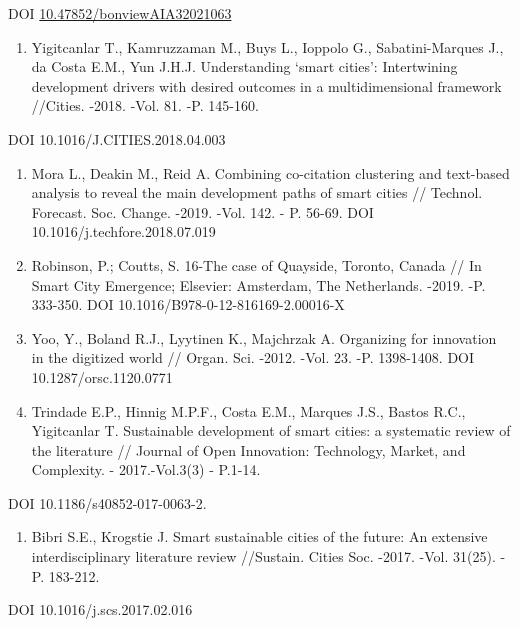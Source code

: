 {DOI
\href{http://dx.doi.org/10.47852/bonviewAIA32021063}{10.47852/bonviewAIA32021063}

\begin{enumerate}
\def\labelenumi{\arabic{enumi}.}
\setcounter{enumi}{16}
\item
  Yigitcanlar T., Kamruzzaman M., Buys L., Ioppolo G., Sabatini-Marques
  J., da Costa E.M., Yun J.H.J. Understanding `smart cities':
  Intertwining development drivers with desired outcomes in a
  multidimensional framework //Cities. -2018. -Vol. 81. -P. 145-160.
\end{enumerate}

DOI 10.1016/J.CITIES.2018.04.003

\begin{enumerate}
\def\labelenumi{\arabic{enumi}.}
\setcounter{enumi}{17}
\item
  Mora L., Deakin M., Reid A. Combining co-citation clustering and
  text-based analysis to reveal the main development paths of smart
  cities // Technol. Forecast. Soc. Change. -2019. -Vol. 142. - P.
  56-69. DOI 10.1016/j.techfore.2018.07.019
\item
  Robinson, P.; Coutts, S. 16-The case of Quayside, Toronto, Canada //
  In Smart City Emergence; Elsevier: Amsterdam, The Netherlands. -2019.
  -P. 333-350. DOI 10.1016/B978-0-12-816169-2.00016-X
\item
  Yoo, Y., Boland R.J., Lyytinen K., Majchrzak A. Organizing for
  innovation in the digitized world // Organ. Sci. -2012. -Vol. 23. -P.
  1398-1408. DOI 10.1287/orsc.1120.0771
\item
  Trindade E.P., Hinnig M.P.F., Costa E.M., Marques J.S., Bastos R.C.,
  Yigitcanlar T. Sustainable development of smart cities: a systematic
  review of the literature // Journal of Open Innovation: Technology,
  Market, and Complexity. - 2017.-Vol.3(3) - P.1-14.
\end{enumerate}

DOI 10.1186/s40852-017-0063-2.

\begin{enumerate}
\def\labelenumi{\arabic{enumi}.}
\setcounter{enumi}{21}
\item
  Bibri S.E., Krogstie J. Smart sustainable cities of the future: An
  extensive interdisciplinary literature review //Sustain. Cities Soc.
  -2017. -Vol. 31(25). -P. 183-212.
\end{enumerate}

DOI 10.1016/j.scs.2017.02.016

}
